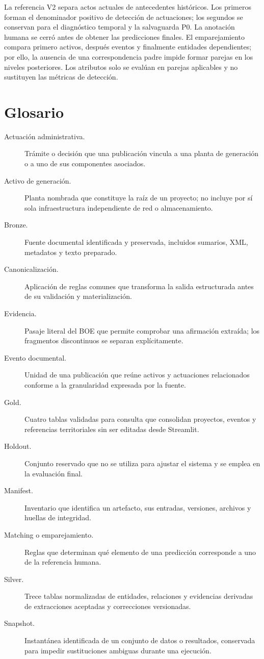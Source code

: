 La referencia V2 separa actos actuales de antecedentes históricos. Los
primeros forman el denominador positivo de detección de actuaciones; los
segundos se conservan para el diagnóstico temporal y la salvaguarda P0. La
anotación humana se cerró antes de obtener las predicciones finales. El
emparejamiento compara primero activos, después eventos y finalmente entidades
dependientes; por ello, la ausencia de una correspondencia padre impide formar
parejas en los niveles posteriores. Los atributos solo se evalúan en parejas
aplicables y no sustituyen las métricas de detección.

\section{Glosario}
\begin{description}
\item[Actuación administrativa.] Trámite o decisión que una publicación vincula
a una planta de generación o a uno de sus componentes asociados.
\item[Activo de generación.] Planta nombrada que constituye la raíz de un
proyecto; no incluye por sí sola infraestructura independiente de red o
almacenamiento.
\item[Bronze.] Fuente documental identificada y preservada, incluidos sumarios,
XML, metadatos y texto preparado.
\item[Canonicalización.] Aplicación de reglas comunes que transforma la salida
estructurada antes de su validación y materialización.
\item[Evidencia.] Pasaje literal del BOE que permite comprobar una afirmación
extraída; los fragmentos discontinuos se separan explícitamente.
\item[Evento documental.] Unidad de una publicación que reúne activos y
actuaciones relacionados conforme a la granularidad expresada por la fuente.
\item[Gold.] Cuatro tablas validadas para consulta que consolidan proyectos,
eventos y referencias territoriales sin ser editadas desde Streamlit.
\item[Holdout.] Conjunto reservado que no se utiliza para ajustar el sistema y
se emplea en la evaluación final.
\item[Manifest.] Inventario que identifica un artefacto, sus entradas,
versiones, archivos y huellas de integridad.
\item[Matching o emparejamiento.] Reglas que determinan qué elemento de una
predicción corresponde a uno de la referencia humana.
\item[Silver.] Trece tablas normalizadas de entidades, relaciones y evidencias
derivadas de extracciones aceptadas y correcciones versionadas.
\item[Snapshot.] Instantánea identificada de un conjunto de datos o resultados,
conservada para impedir sustituciones ambiguas durante una ejecución.
\end{description}
